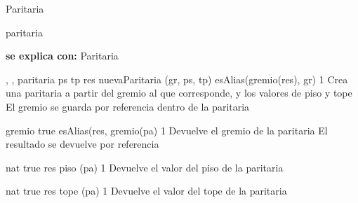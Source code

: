 \begin{interfaz}{Paritaria}

\begin{iparamformales}{paritaria}

\textbf{\large se explica con:} Paritaria

\end{iparamformales}

{, , }{paritaria}
{ps \menorigual tp}
{res \igobs nuevaParitaria (gr, ps, tp)  \ly esAlias(gremio(res), gr) }
{1}
{Crea una paritaria a partir del gremio al que corresponde, y los valores de piso y tope}
{El gremio se guarda por referencia dentro de la paritaria}

{}{gremio}
{true}
{esAlias(res, gremio(pa)  }
{1}
{Devuelve el gremio de la paritaria}
{El resultado se devuelve por referencia}

{}{nat}
{true}
{res \igobs piso (pa)}
{1}
{Devuelve el valor del piso de la paritaria}
{}

{}{nat}
{true}
{res \igobs tope (pa)}
{1}
{Devuelve el valor del tope de la paritaria}
{}

\end{interfaz}